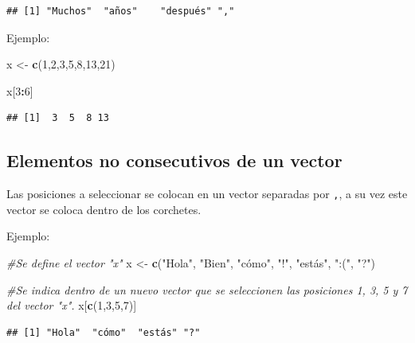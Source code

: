 \documentclass[
]{book}
\newenvironment{Shaded}{\begin{snugshade}}{\end{snugshade}}
\newcommand{\CommentTok}[1]{\textcolor[rgb]{0.56,0.35,0.01}{\textit{#1}}}
\newcommand{\DecValTok}[1]{\textcolor[rgb]{0.00,0.00,0.81}{#1}}
\newcommand{\FunctionTok}[1]{\textcolor[rgb]{0.13,0.29,0.53}{\textbf{#1}}}
\newcommand{\NormalTok}[1]{#1}
\newcommand{\OtherTok}[1]{\textcolor[rgb]{0.56,0.35,0.01}{#1}}
\newcommand{\SpecialCharTok}[1]{\textcolor[rgb]{0.81,0.36,0.00}{\textbf{#1}}}
\newcommand{\StringTok}[1]{\textcolor[rgb]{0.31,0.60,0.02}{#1}}
\begin{document}
\begin{verbatim}
## [1] "Muchos"  "años"    "después" ","
\end{verbatim}

Ejemplo:

\begin{Shaded}
\begin{Highlighting}[]
\NormalTok{x }\OtherTok{\textless{}{-}} \FunctionTok{c}\NormalTok{(}\DecValTok{1}\NormalTok{,}\DecValTok{2}\NormalTok{,}\DecValTok{3}\NormalTok{,}\DecValTok{5}\NormalTok{,}\DecValTok{8}\NormalTok{,}\DecValTok{13}\NormalTok{,}\DecValTok{21}\NormalTok{)}

\NormalTok{x[}\DecValTok{3}\SpecialCharTok{:}\DecValTok{6}\NormalTok{]}
\end{Highlighting}
\end{Shaded}

\begin{verbatim}
## [1]  3  5  8 13
\end{verbatim}

\subsection{Elementos no consecutivos de un vector}\label{elementos-no-consecutivos-de-un-vector}

Las posiciones a seleccionar se colocan en un vector separadas por \texttt{,}, a su vez este vector se coloca dentro de los corchetes.

Ejemplo:

\begin{Shaded}
\begin{Highlighting}[]
\CommentTok{\#Se define el vector "x"}
\NormalTok{x }\OtherTok{\textless{}{-}} \FunctionTok{c}\NormalTok{(}\StringTok{"Hola"}\NormalTok{, }\StringTok{"Bien"}\NormalTok{, }\StringTok{"cómo"}\NormalTok{, }\StringTok{"!"}\NormalTok{, }\StringTok{"estás"}\NormalTok{, }\StringTok{":("}\NormalTok{, }\StringTok{"?"}\NormalTok{)}

\CommentTok{\#Se indica dentro de un nuevo vector que se seleccionen las posiciones 1, 3, 5 y 7 del vector "x". }
\NormalTok{x[}\FunctionTok{c}\NormalTok{(}\DecValTok{1}\NormalTok{,}\DecValTok{3}\NormalTok{,}\DecValTok{5}\NormalTok{,}\DecValTok{7}\NormalTok{)]}
\end{Highlighting}
\end{Shaded}

\begin{verbatim}
## [1] "Hola"  "cómo"  "estás" "?"
\end{verbatim}
\end{document}
